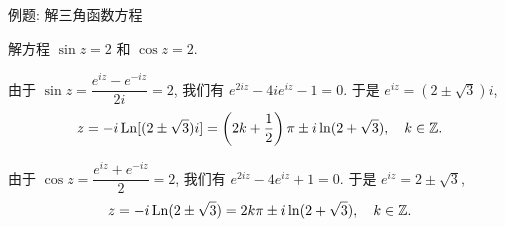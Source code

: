 \begin{frame}{例题: 解三角函数方程}
\begin{example}
解方程 $\sin z=2$ 和 $\cos z=2$.
\end{example}
\begin{solution}
\indent
由于 $\sin z=\dfrac{e^{iz}-e^{-iz}}{2i}=2$,
\onslide<+->
我们有 $e^{2iz}-4ie^{iz}-1=0$.
\onslide<+->
于是 $e^{iz}=(2\pm\sqrt 3)i$,
\onslide<+->
\vspace{-4pt}
\[z=-i\operatorname{Ln}[(2\pm\sqrt 3)i]=\left(2k+\frac12\right)\pi\pm i\ln(2+\sqrt3),\quad k\in{\mathbb{Z}}.\]
\vspace{-14pt}

\indent
\onslide<+->
由于 $\cos z=\dfrac{e^{iz}+e^{-iz}}2=2$,
\onslide<+->
我们有 $e^{2iz}-4e^{iz}+1=0$.
\onslide<+->
于是 $e^{iz}=2\pm\sqrt 3$,
\onslide<+->
\vspace{-4pt}
\[z=-i\operatorname{Ln}(2\pm\sqrt 3)=2k\pi\pm i\ln(2+\sqrt3),\quad k\in{\mathbb{Z}}.\]
\vspace{-14pt}
\end{solution}
\end{frame}

